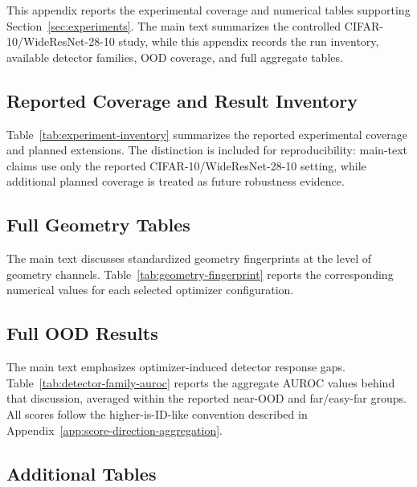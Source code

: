 This appendix reports the experimental coverage and numerical tables supporting
Section~\ref{sec:experiments}. The main text summarizes the controlled
CIFAR-10/WideResNet-28-10 study, while this appendix records the run inventory,
available detector families, OOD coverage, and full aggregate tables.

\subsection{Reported Coverage and Result Inventory}
\label{app:reported-coverage-inventory}

Table~\ref{tab:experiment-inventory} summarizes the reported experimental
coverage and planned extensions. The distinction is included for reproducibility:
main-text claims use only the reported CIFAR-10/WideResNet-28-10 setting, while
additional planned coverage is treated as future robustness evidence.



\subsection{Full Geometry Tables}
\label{app:full-geometry-tables}

The main text discusses standardized geometry fingerprints at the level of
geometry channels. Table~\ref{tab:geometry-fingerprint} reports the corresponding
numerical values for each selected optimizer configuration.



\subsection{Full OOD Results}
\label{app:full-ood-results}

The main text emphasizes optimizer-induced detector response gaps.
Table~\ref{tab:detector-family-auroc} reports the aggregate AUROC values behind that
discussion, averaged within the reported near-OOD and far/easy-far groups. All
scores follow the higher-is-ID-like convention described in
Appendix~\ref{app:score-direction-aggregation}.



\subsection{Additional Tables}
\label{app:additional-tables}

